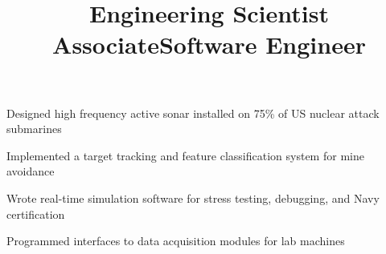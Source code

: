 \documentclass[12pt, tweaklist, line]{res}
\let\tempone\itemize
\let\temptwo\enditemize
\renewenvironment{itemize}{\tempone\vspace{-.15in}\setlength{\topsep}{0pt}\setlength{\itemsep}{3pt}\vspace{-.15in}}{\temptwo}
\def\Cplusplus{{\rm C\raise.5ex\hbox{\small ++}}}
\begin{document}
\begin{resume}
\title{Engineering Scientist Associate} %
\begin{position}
\begin{itemize}
\item Designed high frequency active sonar installed on 75\% of US nuclear attack submarines
\item Implemented a target tracking and feature classification system for mine avoidance
\item Wrote real-time simulation software for stress testing, debugging, and Navy certification
\end{itemize}
\end{position}

\title{Software Engineer}
\begin{position}
\begin{itemize}
\item Programmed interfaces to data acquisition modules for lab machines
\end{itemize}
\end{position}


\end{resume}
\end{document}
